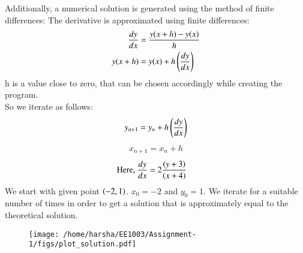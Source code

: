 \documentclass[journal]{IEEEtran}
\numberwithin{equation}{enumi}
\numberwithin{figure}{enumi}
\begin{document}
Additionally, a numerical solution is generated using the method of finite differences:
The derivative is approximated using finite differences:
	\begin{align*}
    \frac{dy}{dx}&=\frac{y(x+h)-y(x)}{h}\\
    y(x+h)&=y(x)+h\left(\frac{dy}{dx}\right)
	\end{align*}
h is a value close to zero, that can be chosen accordingly while creating the program.\\
So we iterate as follows:
	\begin{align*}
		y_{n+1}=y_{n} + h\left(\frac{dy}{dx}\right)
	\end{align*}
	\begin{align*}
		x_{n+1}=x_{n}+h
	\end{align*}
	\begin{align*}
		\text{Here, } \frac{dy}{dx}&=2\frac{\left(y+3\right)}{\left(x+4\right)}
	\end{align*}
We start with given point $\left(-2,1\right)$. $x_{0}=-2$ and $y_{0}=1$. We iterate for a suitable number of times in order to get a solution that is approximately equal to the theoretical solution.
\begin{figure}[!ht]
    \centering
    \texttt{[image: /home/harsha/EE1003/Assignment-1/figs/plot\_solution.pdf]}
    \caption{}
\end{figure}
\end{document}
